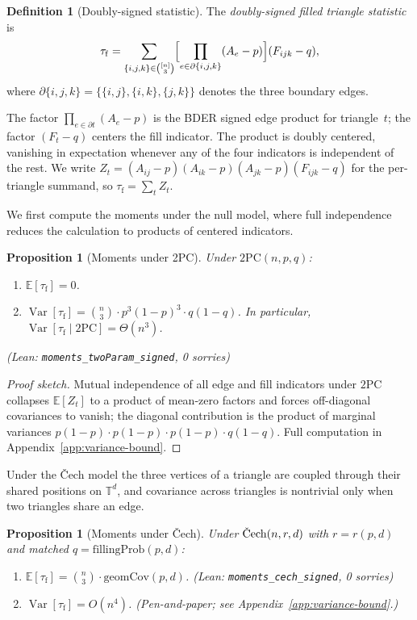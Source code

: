 \documentclass[reqno,12pt]{amsart}
\newcommand{\tauf}{\tau_{\mathrm{f}}}
\newcommand{\PC}{\mathrm{2PC}}
\newcommand{\Cech}{\ifmmode\text{\v{C}ech}\else\v{C}ech\fi}  %
\newcommand{\geomCov}{\mathrm{geomCov}}
\newcommand{\fillingP}{\mathrm{fillingProb}}
\newcommand{\TT}{\mathbb{T}}         %
\newcommand{\EE}{\mathbb{E}}
\DeclareMathOperator{\Var}{Var}
\newcommand{\leanverified}[1]{\textup{(Lean: \texttt{#1}, 0 sorries)}}
\theoremstyle{plain}
\newtheorem{proposition}[theorem]{Proposition}
\theoremstyle{definition}
\newtheorem{definition}[theorem]{Definition}
\theoremstyle{remark}
\begin{document}
\begin{definition}[Doubly-signed statistic]\label{def:tauf}
The \emph{doubly-signed filled triangle statistic} is
\begin{equation}\label{eq:tauf-def}
  \tauf = \sum_{\{i,j,k\}\in\binom{[n]}{3}}
    \Bigl[\prod_{e\in\partial\{i,j,k\}}(A_e - p)\Bigr](F_{ijk} - q),
\end{equation}
where $\partial\{i,j,k\} = \bigl\{\{i,j\},\{i,k\},\{j,k\}\bigr\}$ denotes the three
boundary edges.
\end{definition}

The factor $\prod_{e\in\partial t}(A_e - p)$ is the BDER signed edge product for
triangle~$t$; the factor $(F_t - q)$ centers the fill indicator. The product is doubly
centered, vanishing in expectation whenever any of the four indicators is independent of the
rest. We write $Z_t = (A_{ij}-p)(A_{ik}-p)(A_{jk}-p)(F_{ijk}-q)$ for the per-triangle
summand, so $\tauf = \sum_t Z_t$.

We first compute the moments under the null model, where full independence reduces the
calculation to products of centered indicators.

\begin{proposition}[Moments under 2PC]\label{prop:moments-twopc}
Under $\PC(n,p,q)$:
\begin{enumerate}[label=(\alph*)]
\item $\EE[\tauf] = 0$.
\item $\Var[\tauf] = \binom{n}{3}\cdot p^3(1-p)^3\cdot q(1-q)$.
  In particular, $\Var[\tauf\mid\PC] = \Theta(n^3)$.
\end{enumerate}
\hfill \leanverified{moments\_twoParam\_signed}
\end{proposition}

\begin{proof}[Proof sketch] Mutual independence of all edge and fill indicators under
$\PC$ collapses $\EE[Z_t]$ to a product of mean-zero factors and forces off-diagonal
covariances to vanish; the diagonal contribution is the product of marginal variances
$p(1-p) \cdot p(1-p) \cdot p(1-p) \cdot q(1-q)$. Full computation in
Appendix~\ref{app:variance-bound}.
\end{proof}

Under the \v{C}ech model the three vertices of a triangle are coupled through their
shared positions on $\TT^d$, and covariance across triangles is nontrivial only when
two triangles share an edge.

\begin{proposition}[Moments under \v{C}ech]\label{prop:moments-cech}
Under $\Cech(n,r,d)$ with $r = r(p,d)$ and matched $q = \fillingP(p,d)$:
\begin{enumerate}[label=(\alph*)]
\item $\EE[\tauf] = \binom{n}{3}\cdot\geomCov(p,d)$.
  \hfill \leanverified{moments\_cech\_signed}
\item $\Var[\tauf] = O(n^4)$.
  \textup{(Pen-and-paper; see Appendix~\ref{app:variance-bound}.)}
\end{enumerate}
\end{proposition}
\end{document}
